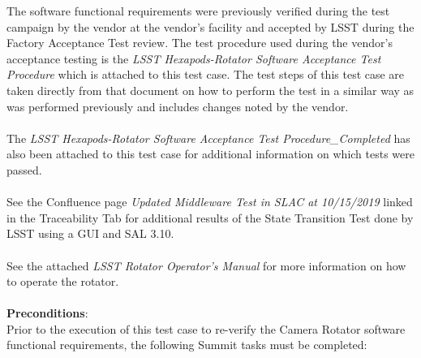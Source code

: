\documentclass[SE,lsstdraft,STR,toc]{lsstdoc}
\begin{document}
The software functional requirements were previously verified during the
test campaign by the vendor at the vendor's facility and accepted by
LSST during the Factory Acceptance Test review. The test procedure used
during the vendor's acceptance testing is the \emph{LSST
Hexapods-Rotator Software Acceptance Test Procedure} which is attached
to this test case. The test steps of this test case are taken directly
from that document on how to perform the test in a similar way as was
performed previously and includes changes noted by the vendor.\\
~\\
The \emph{LSST Hexapods-Rotator Software Acceptance Test
Procedure\_Completed} has also been attached to this test case for
additional information on which tests were passed.\\
~\\
See the Confluence page \emph{Updated Middleware Test in SLAC at
10/15/2019} linked in the Traceability Tab for additional results of the
State Transition Test done by LSST using a GUI and SAL 3.10.\\
~\\
See the attached \emph{LSST Rotator Operator's Manual} for more
information on how to operate the rotator.\\
~\\


    \textbf{ Preconditions}:\\
    Prior to the execution of this test case to re-verify the Camera Rotator
software functional requirements, the following Summit tasks must be
completed:\\
\end{document}
